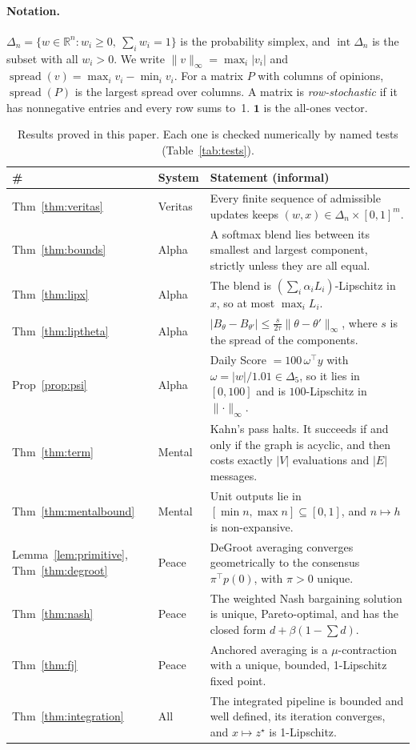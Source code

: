 \documentclass[11pt]{article}
\theoremstyle{definition}
\theoremstyle{remark}
\newcommand{\R}{\mathbb{R}}
\newcommand{\Simp}{\Delta}
\newcommand{\one}{\mathbf{1}}
\newcommand{\ninf}[1]{\lVert #1\rVert_\infty}
\DeclareMathOperator{\spr}{spread}
\begin{document}
\paragraph{Notation.} $\Simp_n=\{w\in\R^n: w_i\ge 0,\ \sum_i w_i=1\}$ is the probability simplex, and $\operatorname{int}\Simp_n$ is the subset with all $w_i>0$. We write $\ninf{v}=\max_i|v_i|$ and $\spr(v)=\max_i v_i-\min_i v_i$. For a matrix $P$ with columns of opinions, $\spr(P)$ is the largest spread over columns. A matrix is \emph{row-stochastic} if it has nonnegative entries and every row sums to~1. $\one$ is the all-ones vector.

\begin{table}[t]
\centering\small
\begin{tabular}{@{}l l p{9.6cm}@{}}
\toprule
\# & System & Statement (informal)\\
\midrule
Thm~\ref{thm:veritas} & Veritas & Every finite sequence of admissible updates keeps $(w,x)\in\Simp_n\times[0,1]^m$.\\
Thm~\ref{thm:bounds} & Alpha & A softmax blend lies between its smallest and largest component, strictly unless they are all equal.\\
Thm~\ref{thm:lipx} & Alpha & The blend is $(\sum_i\alpha_iL_i)$-Lipschitz in $x$, so at most $\max_i L_i$.\\
Thm~\ref{thm:liptheta} & Alpha & $|B_\theta-B_{\theta'}|\le \frac{s}{2\tau}\ninf{\theta-\theta'}$, where $s$ is the spread of the components.\\
Prop~\ref{prop:psi} & Alpha & Daily Score $=100\,\omega^\top y$ with $\omega=|w|/1.01\in\Simp_5$, so it lies in $[0,100]$ and is $100$-Lipschitz in $\ninf{\cdot}$.\\
Thm~\ref{thm:term} & Mental & Kahn's pass halts. It succeeds if and only if the graph is acyclic, and then costs exactly $|V|$ evaluations and $|E|$ messages.\\
Thm~\ref{thm:mentalbound} & Mental & Unit outputs lie in $[\min n,\max n]\subseteq[0,1]$, and $n\mapsto h$ is non-expansive.\\
Lemma~\ref{lem:primitive}, Thm~\ref{thm:degroot} & Peace & DeGroot averaging converges geometrically to the consensus $\pi^\top p(0)$, with $\pi>0$ unique.\\
Thm~\ref{thm:nash} & Peace & The weighted Nash bargaining solution is unique, Pareto-optimal, and has the closed form $d+\beta(1-\sum d)$.\\
Thm~\ref{thm:fj} & Peace & Anchored averaging is a $\mu$-contraction with a unique, bounded, 1-Lipschitz fixed point.\\
Thm~\ref{thm:integration} & All & The integrated pipeline is bounded and well defined, its iteration converges, and $x\mapsto z^\star$ is 1-Lipschitz.\\
\bottomrule
\end{tabular}
\caption{Results proved in this paper. Each one is checked numerically by named tests (Table~\ref{tab:tests}).}
\label{tab:theorems}
\end{table}
\end{document}
